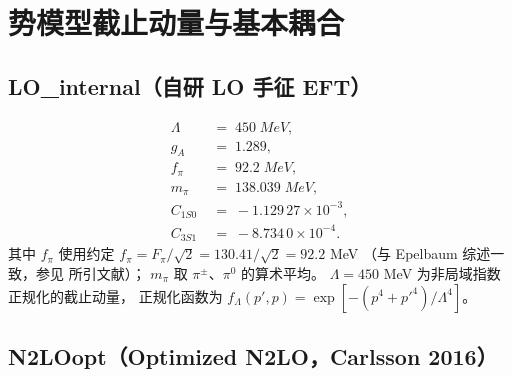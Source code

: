 \section{势模型截止动量与基本耦合}
\label{sec:appA_potential_basics}

\subsection{LO\_internal（自研 LO 手征 EFT）}

\begin{align}
\Lambda &\;=\; 450\;\si{MeV}, \label{eq:appA_LO_Lambda}\\
g_A &\;=\; 1.289, \label{eq:appA_LO_gA}\\
f_\pi &\;=\; 92.2\;\si{MeV}, \label{eq:appA_LO_fpi}\\
m_\pi &\;=\; 138.039\;\si{MeV}, \label{eq:appA_LO_mpi}\\
C_{1S0} &\;=\; -1.129\,27\times 10^{-3},\\
C_{3S1} &\;=\; -8.734\,0\times 10^{-4}.
\end{align}
其中 $f_\pi$ 使用约定 $f_\pi = F_\pi/\sqrt{2} = 130.41/\sqrt{2} = 92.2$ \si{MeV}
（与 Epelbaum 综述一致，参见 \cite{Epelbaum2002NLO3NF} 所引文献）；
$m_\pi$ 取 $\pi^\pm$、$\pi^0$ 的算术平均。
$\Lambda = 450$ \si{MeV} 为非局域指数正规化的截止动量，
正规化函数为 $f_\Lambda(p',p) = \exp[-(p^4 + p'^4)/\Lambda^4]$。

\subsection{N2LOopt（Optimized N2LO，Carlsson 2016）}

